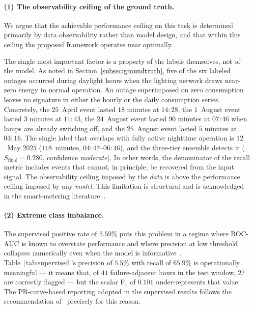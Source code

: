 \documentclass{article}
\begin{document}
\paragraph{(1) The observability ceiling of the ground truth.}
We argue that the achievable performance ceiling on this task is determined primarily by data observability rather than model design, and that within this ceiling the proposed framework operates near optimally.

The single most important factor is a property of the labels themselves, not of the model. As noted in Section~\ref{subsec:groundtruth}, five of the six labeled outages occurred during daylight hours when the lighting network draws near-zero energy in normal operation. An outage superimposed on zero consumption leaves no signature in either the hourly or the daily consumption series. Concretely, the $25$~April event lasted $18$ minutes at $14{:}28$, the $1$~August event lasted $3$ minutes at $11{:}43$, the $24$~August event lasted $90$ minutes at $07{:}46$ when lamps are already switching off, and the $25$~August event lasted $5$ minutes at $03{:}16$. The single label that overlaps with fully active nighttime operation is $12$~May $2025$ ($118$~minutes, $04{:}47$--$06{:}46$), and the three-tier ensemble detects it ($S_{\text{final}}=0.280$, confidence \emph{moderate}). In other words, the denominator of the recall metric includes events that cannot, in principle, be recovered from the input signal. The observability ceiling imposed by the \emph{data} is above the performance ceiling imposed by any \emph{model}. This limitation is structural and is acknowledged in the smart-metering literature~\cite{himeur2021survey}.

\paragraph{(2) Extreme class imbalance.}
The supervised positive rate of $5.59\%$ puts this problem in a regime where ROC-AUC is known to overstate performance and where precision at low threshold collapses numerically even when the model is informative~\cite{saito2015precision,hand2009measuring}. Table~\ref{tab:supervised}'s precision of $5.5\%$ with recall of $65.9\%$ is operationally meaningful --- it means that, of $41$ failure-adjacent hours in the test window, $27$ are correctly flagged --- but the scalar F$_1$ of $0.101$ under-represents that value. The PR-curve-based reporting adopted in the supervised results follows the recommendation of~\cite{saito2015precision} precisely for this reason.
\end{document}
